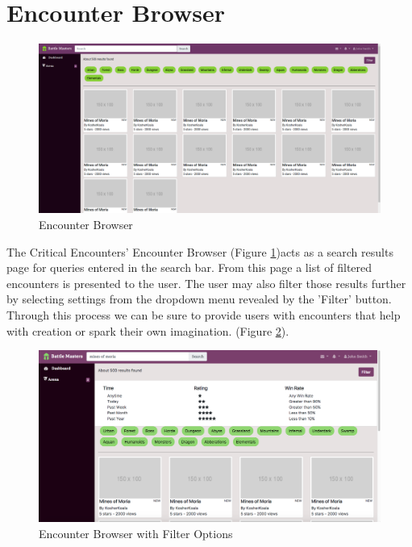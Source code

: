 \documentclass[12pt,a4paper]{report}
\begin{document}
	\section{Encounter Browser}
	\begin{figure}[H]
		\centering
		\includegraphics[scale=.19]{search}
		\caption{Encounter Browser}
		\label{fig: Encounter Browser}
	\end{figure}
	The Critical Encounters' Encounter Browser (Figure \ref{fig: Encounter Browser})acts as a search results page for queries entered in the search bar. From this page a list of filtered encounters is presented to the user. The user may also filter those results further by selecting settings from the dropdown menu revealed by the 'Filter' button. Through this process we can be sure to provide users with encounters that help with creation or spark their own imagination. (Figure \ref{fig: Encounter Browser with Filter Options}).
	\bigskip
	\begin{figure}[H]
		\centering
		\includegraphics[scale=.25]{search_filtered}
		\caption{Encounter Browser with Filter Options}
		\label{fig: Encounter Browser with Filter Options}	
	\end{figure}
	\newpage
\end{document}
